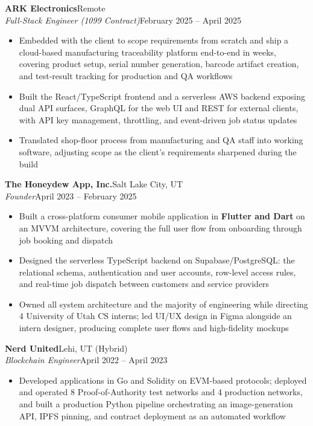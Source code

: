 \documentclass[10.5pt, letterpaper]{article}
\newcommand{\jobentry}[4]{%
  \noindent
  \textbf{\color{accent}#1}\hfill\textcolor{muted}{\small #2}\\
  \textit{#3}\hfill\textcolor{muted}{\small #4}%
}
\begin{document}
\vspace{3pt}

\jobentry{ARK Electronics}{Remote}{Full-Stack Engineer \normalfont\small(1099 Contract)}{February 2025 -- April 2025}
\begin{itemize}
  \item Embedded with the client to scope requirements from scratch and ship a
        cloud-based manufacturing traceability platform end-to-end in weeks,
        covering product setup, serial number generation, barcode artifact
        creation, and test-result tracking for production and QA workflows
  \item Built the React/TypeScript frontend and a serverless AWS backend exposing
        dual API surfaces, GraphQL for the web UI and REST for external clients,
        with API key management, throttling, and event-driven job status updates
  \item Translated shop-floor process from manufacturing and QA staff into
        working software, adjusting scope as the client's requirements sharpened
        during the build
\end{itemize}

\vspace{3pt}

\jobentry{The Honeydew App, Inc.}{Salt Lake City, UT}{Founder}{April 2023 -- February 2025}
\begin{itemize}
  \item Built a cross-platform consumer mobile application in \textbf{Flutter and
        Dart} on an MVVM architecture, covering the full user flow from
        onboarding through job booking and dispatch
  \item Designed the serverless TypeScript backend on Supabase/PostgreSQL: the
        relational schema, authentication and user accounts, row-level access
        rules, and real-time job dispatch between customers and service providers
  \item Owned all system architecture and the majority of engineering while
        directing 4 University of Utah CS interns; led UI/UX design in Figma
        alongside an intern designer, producing complete user flows and
        high-fidelity mockups
\end{itemize}

\vspace{3pt}

\jobentry{Nerd United}{Lehi, UT (Hybrid)}{Blockchain Engineer}{April 2022 -- April 2023}
\begin{itemize}
  \item Developed applications in Go and Solidity on EVM-based protocols; deployed
        and operated 8 Proof-of-Authority test networks and 4 production networks,
        and built a production Python pipeline orchestrating an image-generation
        API, IPFS pinning, and contract deployment as an automated workflow
\end{itemize}
\end{document}
